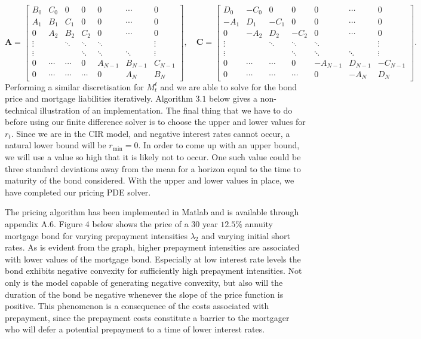 \documentclass[12pt,twoside]{reedthesis}
\begin{document}
\[
\mathbf{A}=\left[\begin{array}{ccccccc}
B_{0} & C_{0} & 0 & 0 & 0 & \cdots & 0 \\
A_{1} & B_{1} & C_{1} & 0 & 0 & \cdots & 0 \\
0 & A_{2} & B_{2} & C_{2} & 0 & \cdots & 0 \\
\vdots & & \ddots & \ddots & \ddots & & \vdots \\
\vdots & & & \ddots & \ddots & \ddots & \vdots \\
0 & \cdots & \cdots & 0 & A_{N-1} & B_{N-1} & C_{N-1} \\
0 & \cdots & \cdots & \cdots & 0 & A_{N} & B_{N}
\end{array}\right], \quad \mathbf{C}=\left[\begin{array}{cccccccc}
D_{0} & -C_{0} & 0 & 0 & 0 & \cdots & 0 \\
-A_{1} & D_{1} & -C_{1} & 0 & 0 & \cdots & 0 \\
0 & -A_{2} & D_{2} & -C_{2} & 0 & \cdots & 0 \\
\vdots & & \ddots & \ddots & \ddots & & \vdots \\
\vdots & & & \ddots & \ddots & \ddots & \vdots \\
0 & \cdots & \cdots & 0 & -A_{N-1} & D_{N-1} & -C_{N-1} \\
0 & \cdots & \cdots & \cdots & 0 & -A_{N} & D_{N}
\end{array}\right] .
\]
Performing a similar discretisation for \(M_{t}^{\ell}\) and we are able to solve for the bond price and mortgage liabilities iteratively. Algorithm \(3.1\) below gives a non-technical illustration of an implementation. The final thing that we have to do before using our finite difference solver is to choose the upper and lower values for \(r_{t}\). Since we are in the CIR model, and negative interest rates cannot occur, a natural lower bound will be \(r_{\min }=0\). In order to come up with an upper bound, we will use a value so high that it is likely not to occur. One such value could be three standard deviations away from the mean for a horizon equal to the time to maturity of the bond considered. With the upper and lower values in place, we have completed our pricing PDE solver.

The pricing algorithm has been implemented in Matlab and is available through appendix A.6. Figure 4 below shows the price of a 30 year \(12.5 \%\) annuity mortgage bond for varying prepayment intensities \(\lambda_{2}\) and varying initial short rates. As is evident from the graph, higher prepayment intensities are associated with lower values of the mortgage bond. Especially at low interest rate levels the bond exhibits negative convexity for sufficiently high prepayment intensities. Not only is the model capable of generating negative convexity, but also will the duration of the bond be negative whenever the slope of the price function is positive. This phenomenon is a consequence of the costs associated with prepayment, since the prepayment costs constitute a barrier to the mortgager who will defer a potential prepayment to a time of lower interest rates.
\end{document}
